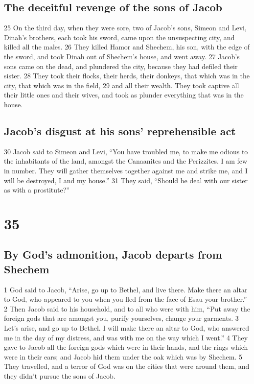 \hypertarget{the-deceitful-revenge-of-the-sons-of-jacob}{%
\subsection{The deceitful revenge of the sons of
Jacob}\label{the-deceitful-revenge-of-the-sons-of-jacob}}

{25} On the third day, when they were sore, two of Jacob's sons, Simeon
and Levi, Dinah's brothers, each took his sword, came upon the
unsuspecting city, and killed all the males. {26} They killed Hamor and
Shechem, his son, with the edge of the sword, and took Dinah out of
Shechem's house, and went away. {27} Jacob's sons came on the dead, and
plundered the city, because they had defiled their sister. {28} They
took their flocks, their herds, their donkeys, that which was in the
city, that which was in the field, {29} and all their wealth. They took
captive all their little ones and their wives, and took as plunder
everything that was in the house.

\hypertarget{jacobs-disgust-at-his-sons-reprehensible-act}{%
\subsection{Jacob's disgust at his sons' reprehensible
act}\label{jacobs-disgust-at-his-sons-reprehensible-act}}

{30} Jacob said to Simeon and Levi, ``You have troubled me, to make me
odious to the inhabitants of the land, amongst the Canaanites and the
Perizzites. I am few in number. They will gather themselves together
against me and strike me, and I will be destroyed, I and my house.''
{31} They said, ``Should he deal with our sister as with a prostitute?''

\hypertarget{section-34}{%
\section{35}\label{section-34}}

\hypertarget{by-gods-admonition-jacob-departs-from-shechem}{%
\subsection{By God's admonition, Jacob departs from
Shechem}\label{by-gods-admonition-jacob-departs-from-shechem}}

{1} God said to Jacob, ``Arise, go up to Bethel, and live there. Make
there an altar to God, who appeared to you when you fled from the face
of Esau your brother.'' {2} Then Jacob said to his household, and to all
who were with him, ``Put away the foreign gods that are amongst you,
purify yourselves, change your garments. {3} Let's arise, and go up to
Bethel. I will make there an altar to God, who answered me in the day of
my distress, and was with me on the way which I went.'' {4} They gave to
Jacob all the foreign gods which were in their hands, and the rings
which were in their ears; and Jacob hid them under the oak which was by
Shechem. {5} They travelled, and a terror of God was on the cities that
were around them, and they didn't pursue the sons of Jacob.


